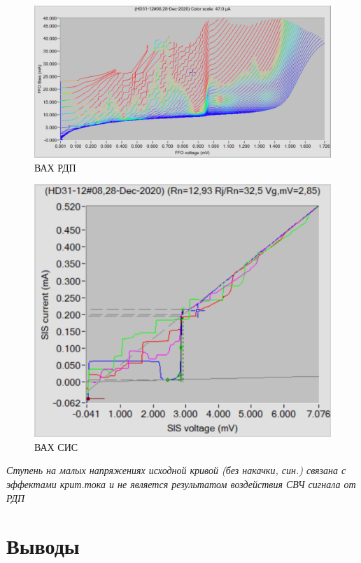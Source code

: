 \documentclass[12pt,a4paper]{article}
\begin{document}
\begin{figure}[H]
    \centering
    \includegraphics[scale = 1.15]{FFO-exp.png}
    \caption{ВАХ РДП}
    \label{FFO-exp}
\end{figure}

\begin{figure}[H]
    \centering
    \includegraphics[scale = 1.7]{sis-exp.png}
    \caption{ВАХ СИС}
    \label{sis-exp}
\end{figure}

\begin{center}
    \textit{Ступень на малых напряжениях исходной кривой (без накачки, син.) связана с эффектами крит.тока и не является результатом воздействия СВЧ сигнала от РДП}
\end{center}

\newpage

\section{Выводы}
\end{document}
